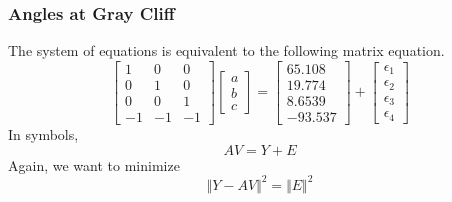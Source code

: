\documentclass[xcolor=dvipsnames]{beamer}
\begin{document}
\begin{frame}
  \frametitle{Angles at Gray Cliff}
The system of equations is equivalent to the following matrix
equation.
\begin{equation}
  \label{eq:ijuniero}
  \left[
    \begin{array}{ccc}
      1 & 0 & 0 \\
      0 & 1 & 0 \\
      0 & 0 & 1 \\
      -1 & -1 & -1
    \end{array}\right]\left[
    \begin{array}{c}
      a \\
      b \\
      c
    \end{array}\right]=\left[
    \begin{array}{c}
      65.108 \\
      19.774 \\
      8.6539 \\
      -93.537
    \end{array}\right]+\left[
    \begin{array}{c}
      \epsilon_{1} \\
      \epsilon_{2} \\
      \epsilon_{3} \\
      \epsilon_{4}
    \end{array}\right]
\end{equation}
In symbols,
\begin{equation}
  \label{eq:eceesien}
  AV=Y+E
\end{equation}
Again, we want to minimize
\begin{equation}
  \label{eq:ahgaituc}
  \Vert{}Y-AV\Vert^{2}=\Vert{}E\Vert^{2}
\end{equation}
\end{frame}
\end{document}
